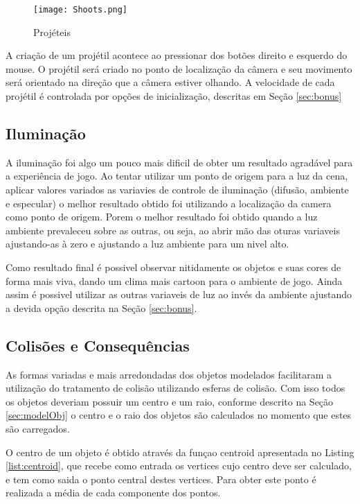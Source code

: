 \documentclass{article}
\begin{document}
\begin{figure}[]
    \centering
    \texttt{[image: Shoots.png]}
    \caption{Projéteis}
    \label{fig:shoots}
\end{figure}

A criação de um projétil acontece ao pressionar dos botões direito e esquerdo do mouse. O projétil será criado no ponto de localização da câmera e seu movimento será orientado na direção que a câmera estiver olhando. A velocidade de cada projétil é controlada por opções de inicialização, descritas em Seção \ref{sec:bonus}

\subsection{Iluminação}

A iluminação foi algo um pouco mais dificil de obter um resultado agradável para a experiência de jogo. Ao tentar utilizar um ponto de origem para a luz da cena, aplicar valores variados as variavies de controle de iluminação (difusão, ambiente e especular) o melhor resultado obtido foi utilizando a localização da camera como ponto de origem. Porem o melhor resultado foi obtido quando a luz ambiente prevaleceu sobre as outras, ou seja, ao abrir mão das oturas variaveis ajustando-as à zero e ajustando a luz ambiente para um nivel alto.

Como resultado final é possivel observar nitidamente os objetos e suas cores de forma mais viva, dando um clima mais cartoon para o ambiente de jogo. Ainda assim é possivel utilizar as outras variaveis de luz ao invés da ambiente ajustando a devida opção descrita na Seção \ref{sec:bonus}.

\subsection{Colisões e Consequências}
\label{sec:coli}

As formas variadas e mais arredondadas dos objetos modelados facilitaram a utilização do tratamento de colisão utilizando esferas de colisão. Com isso todos os objetos deveriam possuir um centro e um raio, conforme descrito na Seção \ref{sec:modelObj} o centro e o raio dos objetos são calculados no momento que estes são carregados.

O centro de um objeto é obtido através da funçao centroid apresentada no Listing \ref{list:centroid}, que recebe como entrada os vertices cujo centro deve ser calculado, e tem como saida o ponto central destes vertices. Para obter este ponto é realizada a média de cada componente dos pontos.
\end{document}
